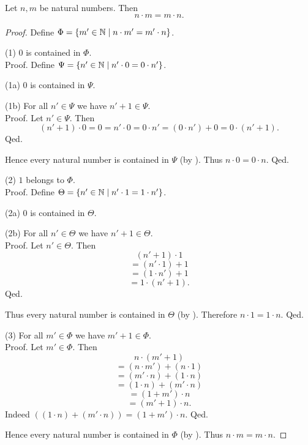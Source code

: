 \documentclass[10pt]{article}
\begin{document}
  \begin{forthel}
    \begin{proposition}[id=ARITHMETIC_06_1764759896588288,printid]
      Let $n, m$ be natural numbers.
      Then \[ n \cdot m = m \cdot n. \]
    \end{proposition}
    \begin{proof}
      Define $\Phi = \{ m' \in \mathbb{N} \mid n \cdot m' = m' \cdot n \}$.

      (1) $0$ is contained in $\Phi$. \\
      Proof.
        Define $\Psi = \{ n' \in \mathbb{N} \mid n' \cdot 0 = 0 \cdot n' \}$.

        (1a) $0$ is contained in $\Psi$.

        (1b) For all $n' \in \Psi$ we have $n' + 1 \in \Psi$. \\
        Proof.
          Let $n' \in \Psi$.
          Then
          \[ (n' + 1) \cdot 0
            = 0
            = n' \cdot 0
            = 0 \cdot n'
            = (0 \cdot n') + 0
            = 0 \cdot (n' + 1). \]
        Qed.

        Hence every natural number is contained in $\Psi$ (by ).
        Thus $n \cdot 0 = 0 \cdot n$.
      Qed.

      (2) $1$ belongs to $\Phi$. \\
      Proof.
        Define $\Theta = \{ n' \in \mathbb{N} \mid n' \cdot 1 = 1 \cdot n' \}$.

        (2a) $0$ is contained in $\Theta$.

        (2b) For all $n' \in \Theta$ we have $n' + 1 \in \Theta$. \\
        Proof.
          Let $n' \in \Theta$.
          Then
          \[  (n' + 1) \cdot 1        \]
          \[    = (n' \cdot 1) + 1    \]
          \[    = (1 \cdot n') + 1    \]
          \[    = 1 \cdot (n' + 1).   \]
        Qed.

        Thus every natural number is contained in $\Theta$ (by ).
        Therefore $n \cdot 1 = 1 \cdot n$.
      Qed.

      (3) For all $m' \in \Phi$ we have $m' + 1 \in \Phi$. \\
      Proof.
        Let $m' \in \Phi$.
        Then
        \[  n \cdot (m' + 1)                \]
        \[    = (n \cdot m') + (n \cdot 1)  \]
        \[    = (m' \cdot n) + (1 \cdot n)  \]
        \[    = (1 \cdot n) + (m' \cdot n)  \]
        \[    = (1 + m') \cdot n            \]
        \[    = (m' + 1) \cdot n.           \]
        Indeed $((1 \cdot n) + (m' \cdot n)) = (1 + m') \cdot n$. %
      Qed.

      Hence every natural number is contained in $\Phi$ (by ).
      Thus $n \cdot m = m \cdot n$.
    \end{proof}
  \end{forthel}
\end{document}
